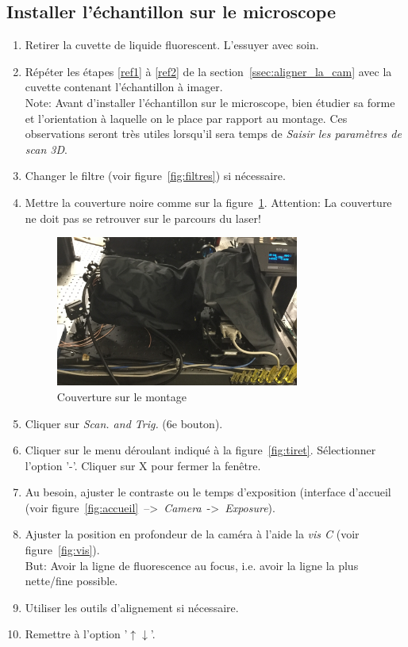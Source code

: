 \subsection{Installer l'échantillon sur le microscope}
\begin{enumerate}
    \item Retirer la cuvette de liquide fluorescent. L'essuyer avec soin.
    \item \label{observations} Répéter les étapes \ref{ref1} à \ref{ref2} de la section~\ref{ssec:aligner_la_cam} avec la cuvette contenant l'échantillon à imager.
    \\ Note: Avant d'installer l'échantillon sur le microscope, bien étudier sa forme et l'orientation à laquelle on le place par rapport au montage. Ces observations seront très utiles lorsqu'il sera temps de \textit{Saisir les paramètres de scan 3D}.
    
    \item Changer le filtre (voir figure~\ref{fig:filtres}) si nécessaire.
    \item Mettre la couverture noire comme sur la figure~\ref{fig:couverture}. Attention: La couverture ne doit pas se retrouver sur le parcours du laser!
        \begin{figure}[H]
        \centering
        \includegraphics[width=8cm]{couverture.jpg}
        \caption{Couverture sur le montage}
        \label{fig:couverture}
        \end{figure}
    
    \item Cliquer sur \textit{Scan. and Trig.} (6e bouton).
    \item Cliquer sur le menu déroulant indiqué à la figure~\ref{fig:tiret}. Sélectionner l'option '-'. Cliquer sur X pour fermer la fenêtre.
    \item Au besoin, ajuster le contraste ou le temps d'exposition (interface d'accueil (voir figure~\ref{fig:accueil}~-->~\textit{Camera}~->~\textit{Exposure}).
   \item Ajuster la position en profondeur de la caméra à l'aide la \textit{vis C} (voir figure~\ref{fig:vis}).
    \\ But: Avoir la ligne de fluorescence au focus, i.e. avoir la ligne la plus nette/fine possible.
    \item Utiliser les outils d'alignement si nécessaire.
    \item Remettre à l'option '$\uparrow\downarrow$'.
\end{enumerate}